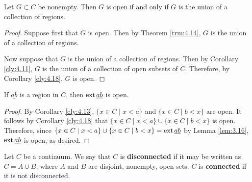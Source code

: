 \documentclass[../main.tex]{subfiles}
\begin{document}
\begin{corollary}\label{cly:4.20}
    Let $G\subset C$ be nonempty. Then $G$ is open if and only if $G$ is the union of a collection of regions.
    \begin{proof}
        Suppose first that $G$ is open. Then by Theorem \ref{trm:4.14}, $G$ is the union of a collection of regions.\par
        Now suppose that $G$ is the union of a collection of regions. Then by Corollary \ref{cly:4.11}, $G$ is the union of a collection of open subsets of $C$. Therefore, by Corollary \ref{cly:4.18}, $G$ is open.
    \end{proof}
\end{corollary}

\begin{corollary}\label{cly:4.21}
    If $\underline{ab}$ is a region in $C$, then $\operatorname{ext}\underline{ab}$ is open.
    \begin{proof}
        By Corollary \ref{cly:4.13}, $\{x\in C\mid x<a\}$ and $\{x\in C\mid b<x\}$ are open. It follows by Corollary \ref{cly:4.18} that $\{x\in C\mid x<a\}\cup\{x\in C\mid b<x\}$ is open. Therefore, since $\{x\in C\mid x<a\}\cup\{x\in C\mid b<x\}=\operatorname{ext}\underline{ab}$ by Lemma \ref{lem:3.16}, $\operatorname{ext}\underline{ab}$ is open, as desired.
    \end{proof}
\end{corollary}

\begin{definition}\label{dfn:4.22}
    Let $C$ be a continuum. We say that $C$ is \textbf{disconnected} if it may be written as $C=A\cup B$, where $A$ and $B$ are disjoint, nonempty, open sets. $C$ is \textbf{connected} if it is not disconnected.
\end{definition}
\end{document}
